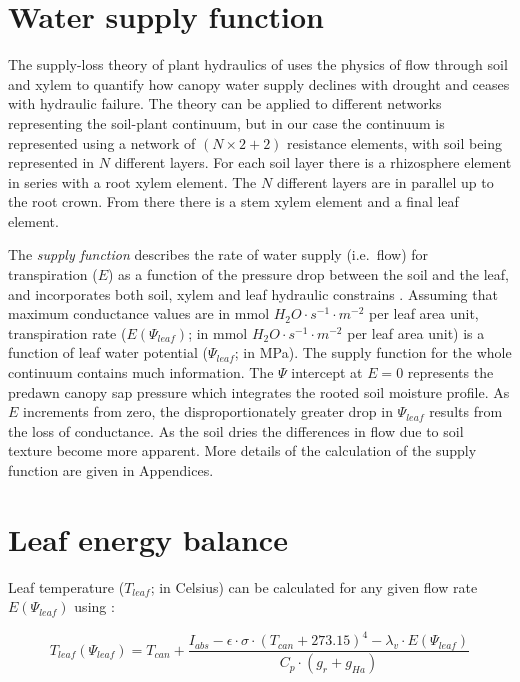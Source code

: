 \documentclass[]{book}
\begin{document}
\section{Water supply function}\label{water-supply-function}

The supply-loss theory of plant hydraulics of \citet{Sperry2015} uses
the physics of flow through soil and xylem to quantify how canopy water
supply declines with drought and ceases with hydraulic failure. The
theory can be applied to different networks representing the soil-plant
continuum, but in our case the continuum is represented using a network
of \((N \times 2 + 2)\) resistance elements, with soil being represented
in \(N\) different layers. For each soil layer there is a rhizosphere
element in series with a root xylem element. The \(N\) different layers
are in parallel up to the root crown. From there there is a stem xylem
element and a final leaf element.

The \emph{supply function} describes the rate of water supply
(i.e.~flow) for transpiration (\(E\)) as a function of the pressure drop
between the soil and the leaf, and incorporates both soil, xylem and
leaf hydraulic constrains \citep{Sperry1998, Sperry2015, Sperry2016a}.
Assuming that maximum conductance values are in mmol
\(H_2O \cdot s^{-1} \cdot m^{-2}\) per leaf area unit, transpiration
rate (\(E(\Psi_{leaf})\); in mmol \(H_2O \cdot s^{-1} \cdot m^{-2}\) per
leaf area unit) is a function of leaf water potential (\(\Psi_{leaf}\);
in MPa). The supply function for the whole continuum contains much
information. The \(\Psi\) intercept at \(E=0\) represents the predawn
canopy sap pressure which integrates the rooted soil moisture profile.
As \(E\) increments from zero, the disproportionately greater drop in
\(\Psi_{leaf}\) results from the loss of conductance. As the soil dries
the differences in flow due to soil texture become more apparent. More
details of the calculation of the supply function are given in
Appendices.

\section{Leaf energy balance}\label{leaf-energy-balance}

Leaf temperature (\(T_{leaf}\); in Celsius) can be calculated for any
given flow rate \(E(\Psi_{leaf})\) using \citep{Campbell1998}:

\begin{equation}
T_{leaf}(\Psi_{leaf}) = T_{can}+\frac{I_{abs}-\epsilon\cdot\sigma\cdot(T_{can}+273.15)^4-\lambda_v\cdot E(\Psi_{leaf})}{C_p\cdot(g_r+g_{Ha})}
\end{equation}
\end{document}
